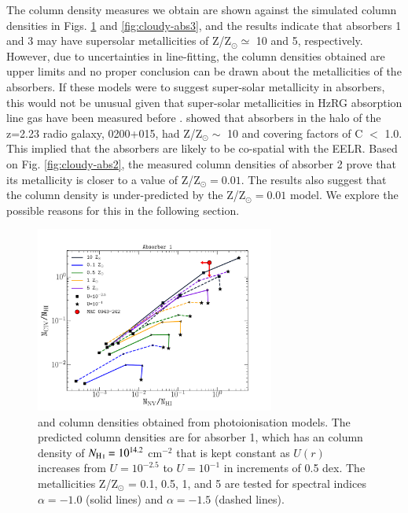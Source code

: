 The column density measures we obtain are shown against the simulated column densities in Figs. \ref{fig:cloudy-abs1} and \ref{fig:cloudy-abs3}, and the results indicate that absorbers 1 and 3 may have supersolar metallicities of Z/Z$_\odot \simeq$ 10 and 5, respectively. However, due to uncertainties in line-fitting, the column densities obtained are upper limits and no proper conclusion can be drawn about the metallicities of the absorbers. If these models were to suggest super-solar metallicity in absorbers, this would not be unusual given that super-solar metallicities in HzRG absorption line gas have been measured before \citep{jarvis2003,binette2006}. \citet{jarvis2003} showed that absorbers in the halo of the z=2.23 radio galaxy, 0200+015, had Z/Z$_\odot \sim$ 10 and covering factors of C $<$ 1.0. This implied that the absorbers are likely to be co-spatial with the EELR. Based on Fig. \ref{fig:cloudy-abs2}, the measured column densities of absorber 2 prove that its metallicity is closer to a value of Z/Z$_\odot = 0.01.$  The results also suggest that the  column density is under-predicted by the Z/Z$_\odot = 0.01$ model. We explore the possible reasons for this in the following section. 

\begin{figure}
\centering 
\includegraphics[width=0.7\textwidth]{plots_chp3/0943_agn_photoion_CIV_NV_HI_abs1_hden_2.pdf}
\caption[Absorber 1:  photoionisation predictions]{ and  column densities obtained from  photoionisation models. The predicted column densities are for absorber 1, which has an  column density of $N_{\ion{H}{I}} = 10^{14.2}$ cm$^{-2}$ that is kept constant as $U(r)$ increases from $U=10^{-2.5}$ to $U=10^{-1}$ in increments of 0.5 dex. The metallicities Z/Z$_\odot$ = 0.1, 0.5, 1, and 5 are tested for spectral indices $\alpha=-1.0$ (solid lines) and $\alpha=-1.5$ (dashed lines).}
\label{fig:cloudy-abs1}
\end{figure}

